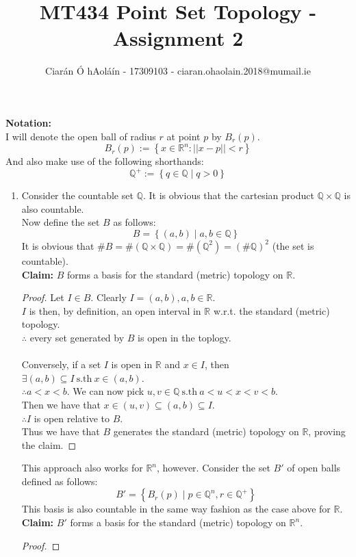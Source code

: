 \documentclass{article}
\title{MT434 Point Set Topology - Assignment 2}
\author{Ciarán Ó hAoláín - 17309103 - ciaran.ohaolain.2018@mumail.ie}
\newcommand{\sth}{\mathrm{s.th}\ }
\newcommand{\R}{\mathbb{R}}
\newcommand{\Q}{\mathbb{Q}}
\newcommand{\norm}[1]{\left|\left|#1\right|\right|}
\theoremstyle{remark}
\theoremstyle{example}
\theoremstyle{examples}
\begin{document}
	\maketitle
	\begin{framed}
		\textbf{Notation:}\\
		I will denote the open ball of radius $r$ at point $p$ by $B_r(p)$.
		\[B_r(p) := \left\{ x \in \R^n : \norm{x-p} < r \right\}\]
		And also make use of the following shorthands:
		\[\Q^+:=\left\{q \in \Q\mid q > 0\right\}\]
	\end{framed}
	\begin{enumerate}
		\item Consider the countable set $\Q$. It is obvious that the cartesian product $\Q \times \Q$ is also countable.\\
		Now define the set $B$ as follows: \[B = \left\{\left(a,b\right) \mid a,b \in \Q \right\}  \]
		It is obvious that $\#B=\#\left(\Q \times \Q \right) = \#(\Q^2) = \left(\# \Q\right)^2$ (the set is countable).\\
		\textbf{Claim:} $B$ forms a basis for the standard (metric) topology on $\R$.
		\begin{proof}
			Let $I \in B$. Clearly $I=(a,b), a, b \in \R$.\\
			$I$ is then, by definition, an open interval in $\R$ w.r.t. the standard (metric) topology.\\
			$\therefore$ every set generated by $B$ is open in the toplogy.\\
			\\
			Conversely, if a set $I$ is open in $\R$ and $x \in I$, then $\exists (a,b) \subseteq I\ \sth x \in (a,b)$.\\
			$\therefore a < x < b$. We can now pick $u, v \in \Q\ \sth a < u < x < v < b$.\\
			Then we have that $x \in (u,v) \subseteq(a,b) \subseteq I$.\\
			$\therefore I$ is open relative to $B$.\\
			Thus we have that $B$ generates the standard (metric) topology on $\R$, proving the claim.
		\end{proof}
		This approach also works for $\R^n$, however. Consider the set $B'$ of open balls defined as follows: \[B' = \left\{ B_r(p) \mid p \in \Q^n, r \in \Q^+ \right\}\] This basis is also countable in the same way fashion as the case above for $\R$.
		\textbf{Claim:} $B'$ forms a basis for the standard (metric) topology on $\R^n$.
		\begin{proof}

\end{proof}
\end{enumerate}
\end{document}

